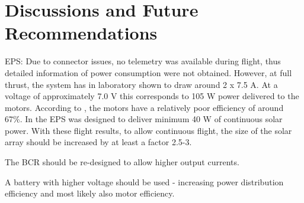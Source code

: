 \section{Discussions and Future Recommendations}
%
EPS: Due to connector issues, no telemetry was available during flight, thus detailed information of power consumption were not obtained. However, at full thrust, the system has in laboratory shown to draw around 2 x 7.5 A. At a voltage of approximately 7.0 V this corresponds to 105 W power delivered to the motors. According to \cite{website:ModelMotors}, the motors have a relatively poor efficiency of around 67\%. In \cite{CDR} the \ac{EPS} was designed to deliver minimum 40 W of continuous solar power. With these flight results, to allow continuous flight, the size of the solar array should be increased by at least a factor 2.5-3.

The BCR should be re-designed to allow higher output currents. 

A battery with higher voltage should be used - increasing power distribution efficiency and most likely also motor efficiency.
